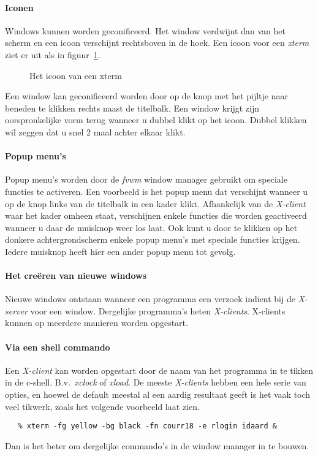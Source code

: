 \paragraph{Iconen}
Windows kunnen worden ge{\ii}conificeerd. Het window verdwijnt dan van het 
scherm en een icoon verschijnt rechtsboven in de hoek. 
Een icoon voor een {\em xterm} ziet er uit als in figuur~\ref{xterm_icon}.
\begin{figure}[bth]
\centerline{}
\caption{Het icoon van een xterm
\label{xterm_icon}}
\end{figure}
Een window kan ge{\ii}conificeerd worden door op de knop met het
pijltje naar beneden te klikken rechts naast de titelbalk.
Een window krijgt zijn oorspronkelijke vorm terug wanneer u dubbel 
klikt op het icoon. Dubbel klikken wil zeggen dat u snel 2 maal achter elkaar
klikt.
\paragraph{Popup menu's}
Popup menu's worden door de {\em fvwm} window manager gebruikt om 
speciale functies te activeren. Een voorbeeld is het popup menu dat verschijnt
wanneer u op de knop links van de titelbalk in een kader klikt. 
Afhankelijk van de {\em X-client} waar het kader omheen staat, verschijnen
enkele functies die worden geactiveerd wanneer u daar de muisknop
weer los laat.
Ook kunt u door te klikken op het donkere achtergrondscherm enkele 
popup menu's met speciale functies krijgen.
Iedere muisknop heeft hier een ander popup menu tot gevolg.
\paragraph{Het cre\"eren van nieuwe windows}
Nieuwe windows ontstaan wanneer een programma een verzoek indient bij
de {\em X-server} voor een window. Dergelijke programma's heten
{\em X-clients}.
X-clients kunnen op meerdere manieren worden opgestart.
\paragraph{Via een shell commando}
Een {\em X-client} kan worden opgestart door de naam van het programma 
in te tikken in de c-shell. B.v.\ {\em xclock} of {\em xload}.
De meeste {\em X-clients} hebben een hele serie van opties, en hoewel de 
default meestal al een aardig resultaat geeft is het vaak toch veel 
tikwerk, zoals het volgende voorbeeld laat zien.
\begin{verbatim}
   % xterm -fg yellow -bg black -fn courr18 -e rlogin idaard &
\end{verbatim}
Dan is het beter om dergelijke commando's in de window manager in te 
bouwen.


